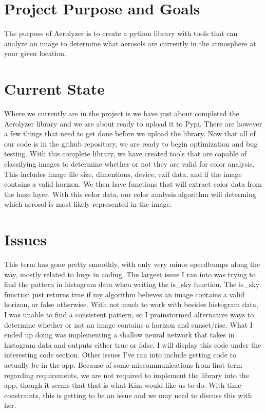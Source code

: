 \documentclass[onecolumn, draftclsnofoot,10pt, compsoc]{IEEEtran}
\begin{document}
\begin{singlespace}

	\section{Project Purpose and Goals}
	The purpose of Aerolyzer is to create a python library with tools that can analyze an image to determine what aerosols are currently in the atmosphere at your given location.
	
		
	\section{Current State}
	Where we currently are in the project is we have just about completed the Aerolyzer library and we are about ready to upload it to Pypi.
	There are however a few things that need to get done before we upload the library.
	Now that all of our code is in the github repository, we are ready to begin optimization and bug testing.
	With this complete library, we have created tools that are capable of classifying images to determine whether or not they are valid for color analysis.
	This includes image file size, dimentions, device, exif data, and if the image contains a valid horizon. 
	We then have functions that will extract color data from the haze layer.
	With this color data, our color analysis algorithm will determing which aerosol is most likely represented in the image. 

	\section{Issues}
	This term has gone pretty smoothly, with only very minor speedbumps along the way, mostly related to bugs in coding.
	The largest issue I ran into was trying to find the pattern in histogram data when writing the is_sky function.
	The is_sky function just returns true if my algorithm believes an image contains a valid horizon, or false otherwise.
	With not much to work with besides histogram data, I was unable to find a consistent pattern, so I prainstormed alternative ways to determine whether or not an image contains a horizon and sunset/rise.
	What I ended up doing was implementing a shallow neural network that takes in histogram data and outputs either true or false.
	I will display this code under the interesting code section.
	Other issues I've ran into include getting code to actually be in the app.
	Because of some miscommunications from first term regarding requirements, we are not required to implement the library into the app, though it seems that that is what Kim would like us to do.
	With time constraints, this is getting to be an issue and we may need to discuss this with her.

\end{singlespace}
\end{document}
